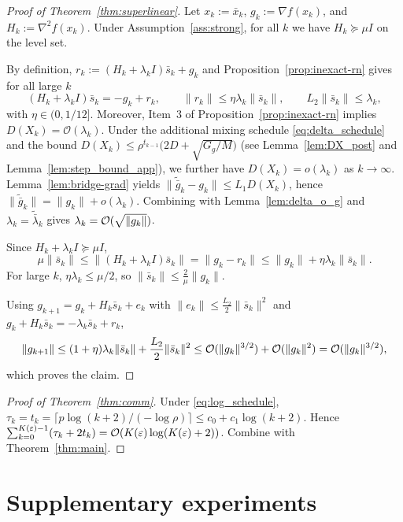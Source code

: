 \documentclass[review,onefignum,onetabnum]{siamart171218}
\begin{document}
\begin{proof}[Proof of Theorem~\ref{thm:superlinear}]
Let $x_k:=\bar x_k$, $g_k:=\nabla f(x_k)$, and $H_k:=\nabla^2 f(x_k)$.
Under Assumption~\ref{ass:strong}, for all $k$ we have $H_k\succeq \mu I$ on the level set.

By definition, $r_k:=(H_k+\lambda_k I)\bar s_k+g_k$ and Proposition~\ref{prop:inexact-rn} gives for all large $k$
\[
(H_k+\lambda_k I)\bar s_k=-g_k+r_k,\qquad \|r_k\|\le \eta\lambda_k\|\bar s_k\|,\qquad L_2\|\bar s_k\|\le \lambda_k,
\]
with $\eta\in(0,1/12]$. Moreover, Item~3 of Proposition~\ref{prop:inexact-rn} implies $D(X_k)=\mathcal O(\lambda_k)$.
Under the additional mixing schedule \eqref{eq:delta_schedule} and the bound
$D(X_k)\le \rho^{t_{k-1}}\big(2D+\sqrt{G_g/M}\big)$ (see Lemma~\ref{lem:DX_post} and Lemma~\ref{lem:step_bound_app}),
we further have $D(X_k)=o(\lambda_k)$ as $k\to\infty$.
Lemma~\ref{lem:bridge-grad} yields
$\|\tilde{\bar g}_k-g_k\|\le L_1D(X_k)$, hence $\|\tilde{\bar g}_k\|=\|g_k\|+o(\lambda_k)$.
Combining with Lemma~\ref{lem:delta_o_g} and $\lambda_k=\tilde{\bar\lambda}_k$ gives $\lambda_k=\mathcal{O}(\sqrt{\|g_k\|})$.

Since $H_k+\lambda_k I\succeq \mu I$,
\[
\mu\|\bar s_k\|\le \|(H_k+\lambda_k I)\bar s_k\|=\|g_k-r_k\|\le \|g_k\|+\eta\lambda_k\|\bar s_k\|.
\]
For large $k$, $\eta\lambda_k\le \mu/2$, so $\|\bar s_k\|\le \frac{2}{\mu}\|g_k\|$.

Using $g_{k+1}=g_k+H_k\bar s_k+e_k$ with $\|e_k\|\le \frac{L_2}{2}\|\bar s_k\|^2$ and $g_k+H_k\bar s_k=-\lambda_k\bar s_k+r_k$,
\[
\|g_{k+1}\|\le (1+\eta)\lambda_k\|\bar s_k\|+\frac{L_2}{2}\|\bar s_k\|^2
\le \mathcal{O}(\|g_k\|^{3/2})+\mathcal{O}(\|g_k\|^2)=\mathcal{O}(\|g_k\|^{3/2}),
\]
which proves the claim.
\end{proof}



\begin{proof}[Proof of Theorem~\ref{thm:comm}]
Under \eqref{eq:log_schedule}, $\tau_k=t_k=\lceil p\log(k+2)/(-\log\rho)\rceil\le c_0+c_1\log(k+2)$.
Hence $\sum_{k=0}^{K(\varepsilon)-1}(\tau_k+2t_k)=\mathcal{O}(K(\varepsilon)\log(K(\varepsilon)+2))$.
Combine with Theorem~\ref{thm:main}.
\end{proof}

\section{Supplementary experiments}\label{app:supp_exp}
\end{document}
